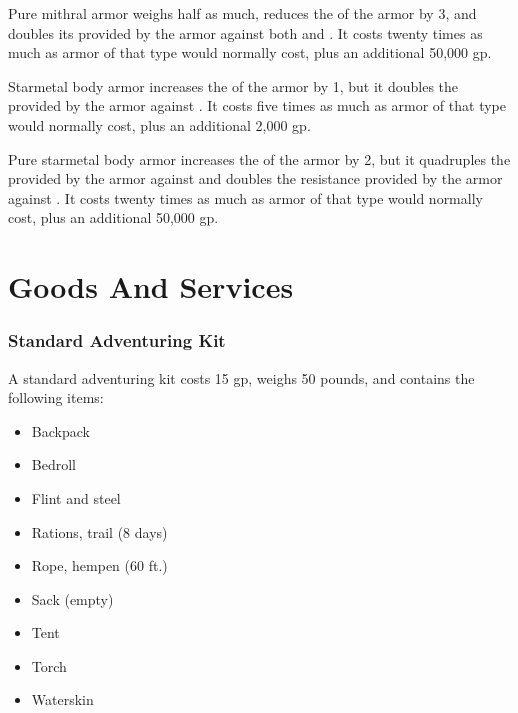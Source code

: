          Pure mithral armor weighs half as much, reduces the  of the armor by 3, and doubles its  provided by the armor against both  and .
        It costs twenty times as much as armor of that type would normally cost, plus an additional 50,000 gp.

         Starmetal body armor increases the  of the armor by 1, but it doubles the  provided by the armor against .
        It costs five times as much as armor of that type would normally cost, plus an additional 2,000 gp.

         Pure starmetal body armor increases the  of the armor by 2, but it quadruples the  provided by the armor against  and doubles the resistance provided by the armor against .
        It costs twenty times as much as armor of that type would normally cost, plus an additional 50,000 gp.

\section{Goods And Services}

    \subsubsection{Standard Adventuring Kit}
        A standard adventuring kit costs 15 gp, weighs 50 pounds, and contains the following items:
        \begin{itemize}
            \item Backpack
            \item Bedroll
            \item Flint and steel
            \item Rations, trail (8 days)
            \item Rope, hempen (60 ft.)
            \item Sack (empty)
            \item Tent
            \item Torch
            \item Waterskin
        \end{itemize}


